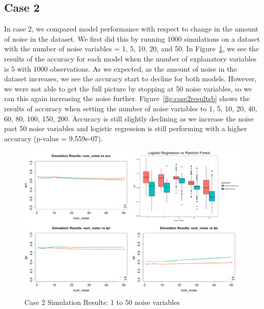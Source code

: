 \documentclass{llncs}
\begin{document}
\subsection{Case 2}
\noindent 
In case 2, we compared model performance with respect to change in the amount of noise in the dataset. We first did this by running 1000 simulations on a dataset with the number of noise variables = 1, 5, 10, 20, and 50.  In Figure~\ref{fig:case2results}, we see the results of the accuracy for each model when the number of explanatory variables is 5 with 1000 observations.  As we expected, as the amount of noise in the dataset increases, we see the accuracy start to decline for both models. However, we were not able to get the full picture by stopping at 50 noise variables, so we ran this again increasing the noise further.  Figure~\ref{fig:case2resultsb} shows the results of accuracy when setting the number of noise variables to 1, 5, 10, 20, 40, 60, 80, 100, 150, 200.  Accuracy is still slightly declining as we increase the noise past 50 noise variables and logistic regression is still performing with a higher accuracy (p-value = 9.559e-07).

\begin{figure}
\centering
\includegraphics[scale=0.55]{case2.png}
\caption{Case 2 Simulation Results: 1 to 50 noise variables}
\label{fig:case2results}
\end{figure}
\end{document}
